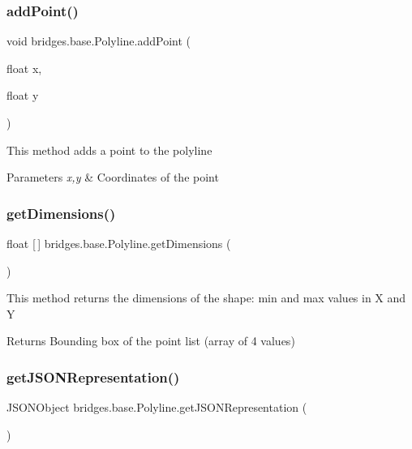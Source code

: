 \subsubsection{\texorpdfstring{add\+Point()}{addPoint()}}
{\footnotesize\ttfamily void bridges.\+base.\+Polyline.\+add\+Point (\begin{DoxyParamCaption}\item[{float}]{x,  }\item[{float}]{y }\end{DoxyParamCaption})}

This method adds a point to the polyline


\begin{DoxyParams}{Parameters}
{\em x,y} & Coordinates of the point \\
\hline
\end{DoxyParams}
\mbox{\label{classbridges_1_1base_1_1_polyline_a5665bd906b841ca71a668581aeb7a181}} 
\subsubsection{\texorpdfstring{get\+Dimensions()}{getDimensions()}}
{\footnotesize\ttfamily float \mbox{[}$\,$\mbox{]} bridges.\+base.\+Polyline.\+get\+Dimensions (\begin{DoxyParamCaption}{ }\end{DoxyParamCaption})}

This method returns the dimensions of the shape\+: min and max values in X and Y

\begin{DoxyReturn}{Returns}
Bounding box of the point list (array of 4 values) 
\end{DoxyReturn}
\mbox{\label{classbridges_1_1base_1_1_polyline_a4ac266909645f8db9b7fcc4836f6069a}} 
\subsubsection{\texorpdfstring{get\+J\+S\+O\+N\+Representation()}{getJSONRepresentation()}}
{\footnotesize\ttfamily J\+S\+O\+N\+Object bridges.\+base.\+Polyline.\+get\+J\+S\+O\+N\+Representation (\begin{DoxyParamCaption}{ }\end{DoxyParamCaption})}

